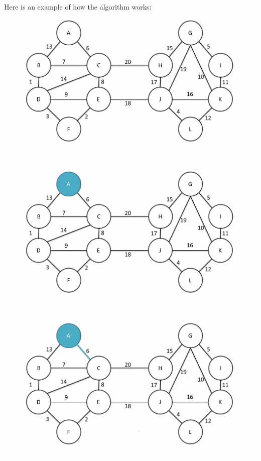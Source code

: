 \documentclass[
	11pt, %
]{beamer}
\begin{document}
\begin{frame}
    Here is an example of how the algorithm works:
    \includegraphics[width = 1\textwidth]{baruvka-example/frame_00_delay-1s.png}
\end{frame}
\begin{frame}
    \includegraphics[width = 1\textwidth]{baruvka-example/frame_01_delay-1s.png}
\end{frame}
\begin{frame}
    \includegraphics[width = 1\textwidth]{baruvka-example/frame_02_delay-1s.png}
\end{frame}
\end{document}
